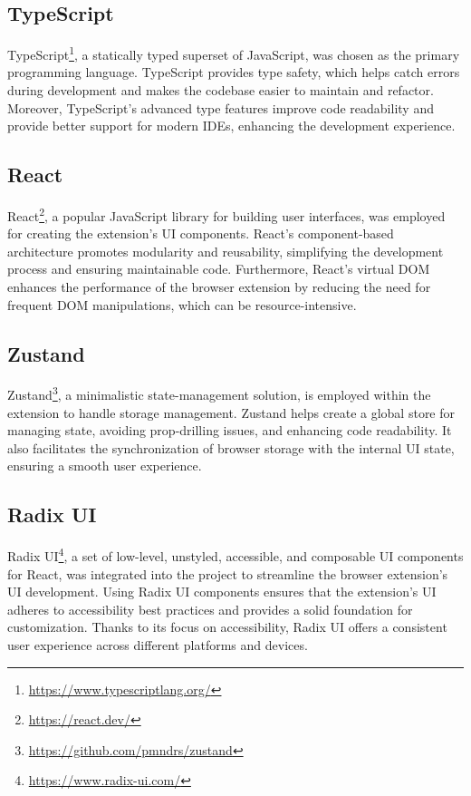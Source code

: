 \subsection{TypeScript}

TypeScript\footnote{\url{https://www.typescriptlang.org/}}, a statically typed superset of JavaScript, was chosen as the primary programming language. TypeScript provides type safety, which helps catch errors during development and makes the codebase easier to maintain and refactor. Moreover, TypeScript's advanced type features improve code readability and provide better support for modern IDEs, enhancing the development experience.

\subsection{React}

React\footnote{\url{https://react.dev/}}, a popular JavaScript library for building user interfaces, was employed for creating the extension's UI components. React's component-based architecture promotes modularity and reusability, simplifying the development process and ensuring maintainable code. Furthermore, React's virtual DOM enhances the performance of the browser extension by reducing the need for frequent DOM manipulations, which can be resource-intensive.

\subsection{Zustand}

Zustand\footnote{\url{https://github.com/pmndrs/zustand}}, a minimalistic state-management solution, is employed within the extension to handle storage management. Zustand helps create a global store for managing state, avoiding prop-drilling issues, and enhancing code readability. It also facilitates the synchronization of browser storage with the internal UI state, ensuring a smooth user experience.

\subsection{Radix UI}

Radix UI\footnote{\url{https://www.radix-ui.com/}}, a set of low-level, unstyled, accessible, and composable UI components for React, was integrated into the project to streamline the browser extension's UI development. Using Radix UI components ensures that the extension's UI adheres to accessibility best practices and provides a solid foundation for customization. Thanks to its focus on accessibility, Radix UI offers a consistent user experience across different platforms and devices.

